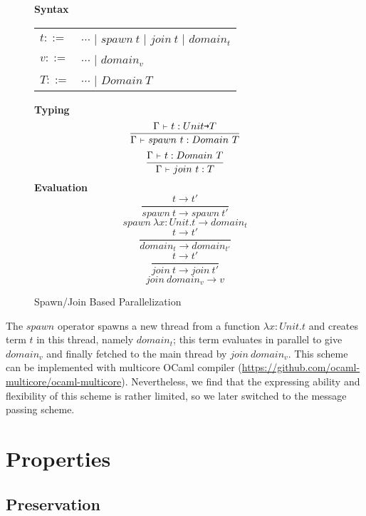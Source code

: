 \documentclass{report}
\newcommand{\arr}{\texttt{→}}
\newcommand{\ty}{{:}}
\newcommand{\type}{:}
\newcommand{\ctx}{~\mathsmaller\vdash~}
\newcommand{\ctxtype}[2]{\Gamma\ctx #1 \type #2}
\begin{document}
\begin{figure}[!ht]
  \begin{multicols}{2}
    \centering
    \textbf{Syntax}\hfill\mbox{}

    \begin{tabular}{ll}
      $t ::=$ & $\cdots$ | $spawn~t$ | $join~t$ | $domain_t$ \\
      $v ::=$ & $\cdots$ | $domain_v$ \\
      $T ::=$ & $\cdots$ | $Domain~T$ \\
    \end{tabular}

    \vspace{2em}

    \textbf{Typing}\hfill \fbox{$\ctxtype{t}{T}$}
    $$
      \frac{\ctxtype{t}{Unit\arr T}}{\ctxtype{spawn~t}{Domain~T}}
    $$
    $$
      \frac{\ctxtype{t}{Domain~T}}{\ctxtype{join~t}{T}}
    $$
    \textbf{Evaluation}\hfill {}
    $$
      \frac{t\longrightarrow t'}{spawn~t\longrightarrow spawn~t'}
    $$
    $$
      spawn~\lambda x\ty Unit.t\longrightarrow domain_t
    $$
    $$
      \frac{t\longrightarrow t'}{domain_t\longrightarrow domain_{t'}}
    $$
    $$
      \frac{t\longrightarrow t'}{join~t\longrightarrow join~t'}
    $$
    $$
      join~domain_v\longrightarrow v
    $$
  \end{multicols}
  \caption{Spawn/Join Based Parallelization}
  \label{multithreading}
\end{figure}

The $spawn$ operator spawns a new thread from a function $\lambda x\ty Unit.t$ and creates term $t$ in this thread, namely $domain_t$; this term evaluates in parallel to give $domain_v$ and finally fetched to the main thread by $join~domain_v$. This scheme can be implemented with multicore OCaml compiler (\url{https://github.com/ocaml-multicore/ocaml-multicore}). Nevertheless, we find that the expressing ability and flexibility of this scheme is rather limited, so we later switched to the message passing scheme.

\chapter{Properties}

\section{Preservation}
\end{document}
